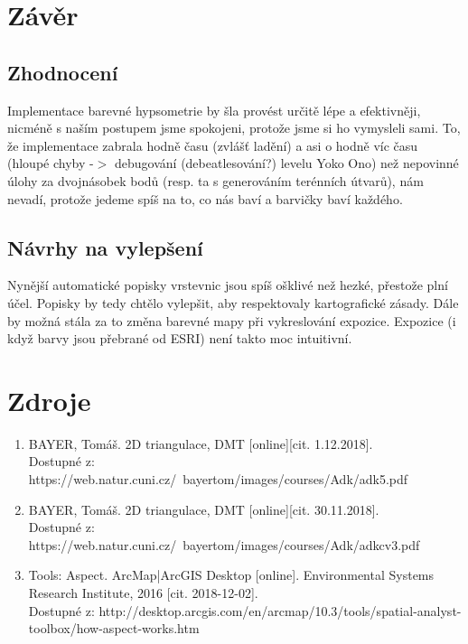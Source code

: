 \documentclass[a4paper, 12pt]{article}
\begin{document}
\section{Závěr}

\subsection{Zhodnocení}
Implementace barevné hypsometrie by šla provést určitě lépe a efektivněji, nicméně s naším postupem jsme spokojeni, protože jsme si ho vymysleli sami. To, že implementace zabrala hodně času (zvlášť ladění) a asi o hodně víc času (hloupé chyby -$>$ debugování (debeatlesování?) levelu Yoko Ono) než nepovinné úlohy za dvojnásobek bodů (resp. ta s generováním terénních útvarů), nám nevadí, protože jedeme spíš na to, co nás baví a barvičky baví každého.
\subsection{Návrhy na vylepšení}
Nynější automatické popisky vrstevnic jsou spíš ošklivé než hezké, přestože plní účel. Popisky by tedy chtělo vylepšit, aby respektovaly kartografické zásady. Dále by možná stála za to změna barevné mapy při vykreslování expozice. Expozice (i když barvy jsou přebrané od ESRI) není takto moc intuitivní. 

\clearpage
\section{Zdroje}

\begin{enumerate}
\item  BAYER, Tomáš. 2D triangulace, DMT [online][cit. 1.12.2018]. \\
Dostupné z: https://web.natur.cuni.cz/~bayertom/images/courses/Adk/adk5.pdf  \\

\item  BAYER, Tomáš. 2D triangulace, DMT [online][cit. 30.11.2018]. \\
Dostupné z: https://web.natur.cuni.cz/~bayertom/images/courses/Adk/adkcv3.pdf\\

\item Tools: Aspect. ArcMap|ArcGIS Desktop [online]. Environmental Systems Research Institute, 2016 [cit. 2018-12-02]. \\
Dostupné z: http://desktop.arcgis.com/en/arcmap/10.3/tools/spatial-analyst-toolbox/how-aspect-works.htm\\
\end{enumerate}
\end{document}
